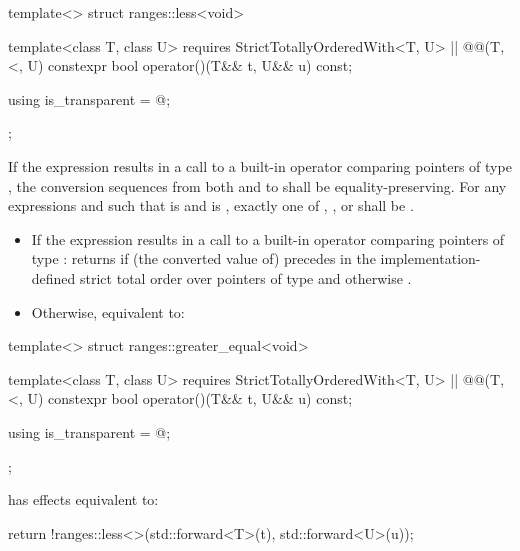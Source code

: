 %
\begin{itemdecl}
template<> struct ranges::less<void> {
  template<class T, class U>
    requires StrictTotallyOrderedWith<T, U> || @@(T, <, U)
  constexpr bool operator()(T&& t, U&& u) const;

  using is_transparent = @\unspecnc@;
};
\end{itemdecl}

\begin{itemdescr}
\pnum
\expects
If the expression  results in a
call to a built-in operator \tcode{<} comparing pointers of type , the
conversion sequences from both  and  to  shall be
equality-preserving. For any expressions
 and  such that  is  and
 is , exactly one of
,
, or
shall be .

\pnum
\effects
\begin{itemize}
\item
If the expression  results in a
call to a built-in operator \tcode{<} comparing pointers of type :
returns  if (the converted value of)  precedes  in
the implementation-defined strict total order over pointers of type 
and otherwise .


\item
Otherwise, equivalent to:
\end{itemize}
\end{itemdescr}

%
\begin{itemdecl}
template<> struct ranges::greater_equal<void> {
  template<class T, class U>
    requires StrictTotallyOrderedWith<T, U> || @@(T, <, U)
  constexpr bool operator()(T&& t, U&& u) const;

  using is_transparent = @\unspecnc@;
};
\end{itemdecl}

\begin{itemdescr}
\pnum
{} has effects equivalent to:
\begin{codeblock}
return !ranges::less<>{}(std::forward<T>(t), std::forward<U>(u));
\end{codeblock}
\end{itemdescr}

